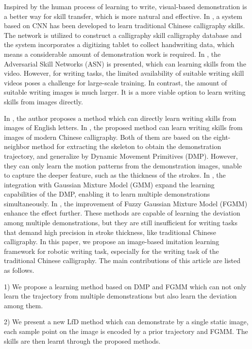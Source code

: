 \documentclass[journal]{IEEEtran}
\begin{document}
Inspired by the human process of learning to write, visual-based demonstration is a better way for skill transfer, which is more natural and effective. In \cite{Zhang2019}, a system based on CNN has been developed to learn traditional Chinese calligraphy skills. The network is utilized to construct a calligraphy skill calligraphy database and the system incorporates a digitizing tablet to collect handwriting data, which means a considerable amount of demonstration work is required. In \cite{Mees2020}, the Adversarial Skill Networks (ASN) is presented, which can learning skills from the video. However, for writing tasks, the limited availability of suitable writing skill videos poses a challenge for large-scale training. In contrast, the amount of suitable writing images is much larger. It is a more viable option to learn writing skills from images directly.

In \cite{Zhang2023}, the author proposes a method which can directly learn writing skills from images of English letters. In \cite{Li2021,Li2022,Li2024}, the proposed method can learn writing skills from images of modern Chinese calligraphy. Both of them are based on the eight-neighbor method for extracting the skeleton to obtain the demonstration trajectory, and generalize by Dynamic Movement Primitives (DMP)\cite{Ijspeert2013}. However, they can only learn the motion patterns from the demonstration images, unable to capture the deeper feature, such as the thickness of the strokes. In \cite{Yang2019}, the integration with Gaussian Mixture Model (GMM) expand the learning capabilities of the DMP, enabling it to learn multiple demonstrations simultaneously. In \cite{Yang2019c}, the improvement of Fuzzy Gaussian Mixture Model (FGMM)\cite{Ju2012} enhance the effect further. These methods are capable of learning the deviation among multiple demonstrations, but they are still insufficient for writing tasks that demand high precision in stroke thickness, like traditional Chinese calligraphy. In this paper, we propose an image-based imitation learning framework for robotic writing task, especially for the writing task of the traditional Chinese calligraphy. The main contributions of this article are listed as follows. 

1) We propose a learning method based on DMP and FGMM which can not only learn the trajectory from multiple demonstrations but also learn the deviation among them.

2) We present a new LfD method which can demonstrate by a single static image, each sample point on the image is encoded by a prior trajectory and FGMM. The skills are then learnt through the proposed methods.
\end{document}

